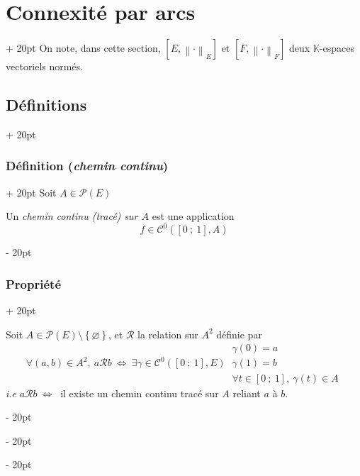 \documentclass[a4paper, 12pt, twoside]{article}
\newcommand{\K}{\mathbb K}
\newcommand{\seg}[2]{\left[ #1\ ;\ #2 \right]}
\newcommand{\lr}[1]{\left( #1 \right)}
\newcommand{\set}[1]{\left\{ #1 \right\}}
\newcommand{\norm}[1]{\left\lVert #1 \right\rVert}
\newcommand{\ssi}{\ \Leftrightarrow \ }
\newcommand{\ind}[1][20pt]{\advance\leftskip + #1}
\newcommand{\deind}[1][20pt]{\advance\leftskip - #1}
\newenvironment{indt}[2][20pt]{#2 \par \ind[#1]}{\par \deind} %
\begin{document}
    \vspace{12pt}
    
    \begin{indt}{\section{Connexité par arcs}}
        On note, dans cette section, $[E, \norm \cdot _E]$ et $[F, \norm \cdot _F]$ deux $\K$-espaces vectoriels normés.

        \begin{indt}{\subsection{Définitions}}
            \begin{indt}{\subsubsection{Définition (\textit{chemin continu})}}
                Soit $A \in \mathcal P(E)$

                Un \emph{chemin continu (tracé) sur $A$} est une application
                \[
                    f \in \mathcal C^0\!\lr{\seg 0 1, A}
                \]
            \end{indt}

            \vspace{12pt}
            
            \begin{indt}{\subsubsection{Propriété}}
                \label{5.1.2}

                Soit $A \in \mathcal P(E) \setminus \set \varnothing$, et $\mathcal R$ la relation sur $A^2$ définie par
                \[
                    \forall (a, b) \in A^2,\
                    a \mathcal R b
                    \ssi
                    \exists \gamma \in \mathcal C^0\!\lr{\seg 0 1, E}\
                    \begin{array}{|l}
                        \gamma(0) = a
                        \\
                        \gamma(1) = b
                        \\
                        \forall t \in \seg 0 1,\ \gamma(t) \in A
                    \end{array}
                \]
                \textit{i.e} $a \mathcal R b \ssi$ il existe un chemin continu tracé sur $A$ reliant $a$ à $b$.


\end{indt}
\end{indt}
\end{indt}
\end{document}
